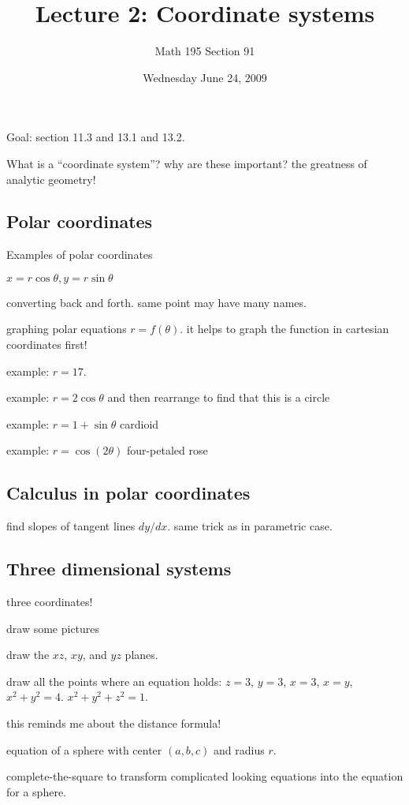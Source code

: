 \documentclass[12pt]{article}
\title{Lecture 2: Coordinate systems}
\author{Math 195 Section 91}
\date{Wednesday June 24, 2009}
\begin{document}
\maketitle

Goal: section 11.3 and 13.1 and 13.2.

What is a ``coordinate system''?  why are these important?  the greatness of analytic geometry!

\subsection{Polar coordinates}

Examples of polar coordinates

$x = r \cos \theta, y = r \sin \theta$

converting back and forth.  same point may have many names.

graphing polar equations $r = f(\theta)$.  it helps to graph the function in cartesian coordinates first!

example: $r = 17$.

example: $r = 2 \cos \theta$ and then rearrange to find that
this is a circle

example: $r = 1 + \sin \theta$ cardioid

example: $r = \cos (2 \theta)$ four-petaled rose

\subsection{Calculus in polar coordinates}

find slopes of tangent lines $dy/dx$.  same trick as in parametric case.

\subsection{Three dimensional systems}

three coordinates!

draw some pictures

draw the $xz$, $xy$, and $yz$ planes.

draw all the points where an equation holds: $z=3$, $y = 3$, $x = 3$, $x = y$, $x^2 + y^2 = 4$.  $x^2 + y^2 + z^2 = 1$.

this reminds me about the distance formula!

equation of a sphere with center $(a,b,c)$ and radius $r$.

complete-the-square to transform complicated looking equations into the equation for a sphere.
\end{document}
